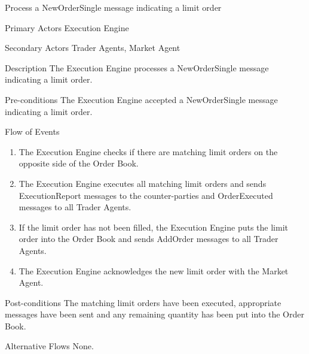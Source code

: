 \begin{usecase}{Process a NewOrderSingle message indicating a limit order}
\item[Primary Actors] Execution Engine
\item[Secondary Actors] Trader Agents, Market Agent
\item[Description] The Execution Engine processes a NewOrderSingle message indicating a limit order.
\item[Pre-conditions] The Execution Engine accepted a NewOrderSingle message indicating a limit order.
\item[Flow of Events] 
\begin{enumerate}
\item The Execution Engine checks if there are matching limit orders on the opposite side of the Order Book.
\item The Execution Engine executes all matching limit orders and sends ExecutionReport messages to the counter-parties and OrderExecuted messages to all Trader Agents.
\item If the limit order has not been filled, the Execution Engine puts the limit order into the Order Book and sends AddOrder messages to all Trader Agents.
\item The Execution Engine acknowledges the new limit order with the Market Agent.
\end{enumerate}
\item[Post-conditions] The matching limit orders have been executed, appropriate messages have been sent and any remaining quantity has been put into the Order Book.
\item[Alternative Flows] None.
\end{usecase}

